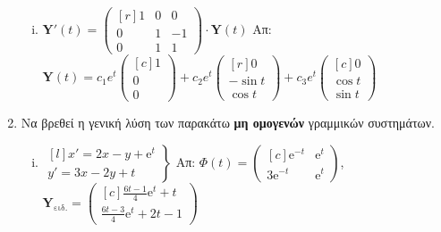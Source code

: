 \begin{enumerate}
\begin{enumerate}[i)]
    \item $ \mathbf{Y}'(t) = 
      \begin{pmatrix*}[r]
        1 & 0 & 0 \\
        0 & 1 & -1 \\
        0 & 1 & 1
      \end{pmatrix*} \cdot 
      \mathbf{Y}(t) $
      \hfill Απ: {\scriptsize $ \mathbf{Y}(t) = c_{1}e^{t} 
        \begin{pmatrix*}[c] 1 \\ 0 \\ 0 \end{pmatrix*} + c_{2}e^{t} 
        \begin{pmatrix*}[r] 0 \\ - \sin{t} \\ \cos{t}  \end{pmatrix*} + c_{3}e^{t} 
      \begin{pmatrix*}[c] 0 \\ \cos{t} \\ \sin{t}   \end{pmatrix*}$} 
  \end{enumerate}


  \item Να βρεθεί η γενική λύση των παρακάτω \textbf{μη ομογενών} γραμμικών συστημάτων. 

    \begin{enumerate}[i)]
      \item $ 
        \left.
          \begin{matrix*}[l]
            x' = 2x-y+ \mathrm{e}^{t} \\
            y' = 3x-2y+t
          \end{matrix*} 
        \right\} $
        \hfill Απ: $ \Phi(t) = 
        \begin{pmatrix*}[c]
          \mathrm{e}^{-t} & \mathrm{e}^{t} \\
          3 \mathrm{e}^{-t} & \mathrm{e}^{t}
        \end{pmatrix*} $, \; $ \mathbf{Y}_{\text{ειδ.}} = 
        \begin{pmatrix*}[c] \frac{6t-1}{4} \mathrm{e}^{t} + t \\ \frac{6t-3}{4}
        \mathrm{e}^{t} +2t-1 \end{pmatrix*} $   


\end{enumerate}
\end{enumerate}
